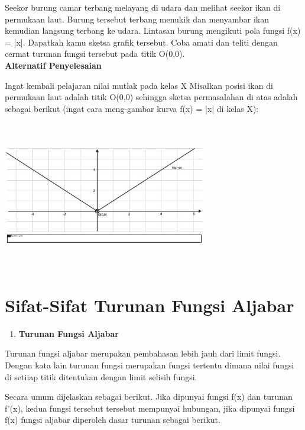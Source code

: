 \documentclass[11pt,fleqn]{book} %
\begin{document}
\noindent
Seekor burung camar terbang melayang di udara dan melihat seekor ikan di permukaan laut. Burung tersebut terbang menukik dan menyambar ikan kemudian langsung terbang ke udara. Lintasan burung mengikuti pola fungsi f(x) = |x|. Dapatkah kamu sketsa grafik tersebut. Coba amati dan teliti dengan cermat turunan fungsi tersebut pada titik O(0,0).\\
	 
\noindent 
\textbf{Alternatif Penyelesaian}

\noindent 
Ingat kembali pelajaran nilai mutlak pada kelas X
\noindent 
Misalkan posisi ikan di permukaan laut adalah titik O(0,0) sehingga sketsa permasalahan di atas adalah sebagai berikut (ingat cara meng-gambar kurva f(x) = |x| di kelas X):

\noindent 
\begin{center}
\noindent \includegraphics*[width=3.50in, height=2.55in, keepaspectratio=false, trim=0.00in 0.11in 0.00in 0.00in]{Pictures/TurunanFungsi6.JPG}
\end{center}


\section{Sifat-Sifat Turunan Fungsi Aljabar}

\noindent
\begin{enumerate}
\item \textbf{Turunan Fungsi Aljabar}
\end{enumerate}

\noindent 
Turunan fungsi aljabar merupakan pembahasan lebih jauh dari limit fungsi. Dengan kata lain turunan fungsi merupakan fungsi tertentu dimana nilai fungsi di setiiap titik ditentukan dengan limit selisih fungsi.

\noindent 
Secara umum dijelaskan sebagai berikut.  Jika dipunyai fungsi f(x) dan turunan f'(x), kedua fungsi tersebut tersebut mempunyai hubungan, jika dipunyai fungsi f(x) fungsi aljabar diperoleh dasar turunan sebagai berikut.
\end{document}
